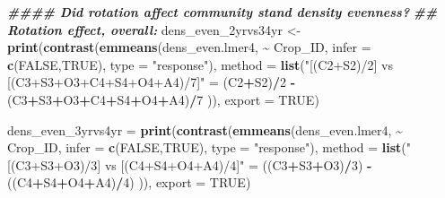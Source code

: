 \documentclass[
]{article}
\newenvironment{Shaded}{\begin{snugshade}}{\end{snugshade}}
\newcommand{\AttributeTok}[1]{\textcolor[rgb]{0.13,0.29,0.53}{#1}}
\newcommand{\ConstantTok}[1]{\textcolor[rgb]{0.56,0.35,0.01}{#1}}
\newcommand{\DecValTok}[1]{\textcolor[rgb]{0.00,0.00,0.81}{#1}}
\newcommand{\DocumentationTok}[1]{\textcolor[rgb]{0.56,0.35,0.01}{\textbf{\textit{#1}}}}
\newcommand{\FunctionTok}[1]{\textcolor[rgb]{0.13,0.29,0.53}{\textbf{#1}}}
\newcommand{\NormalTok}[1]{#1}
\newcommand{\OtherTok}[1]{\textcolor[rgb]{0.56,0.35,0.01}{#1}}
\newcommand{\SpecialCharTok}[1]{\textcolor[rgb]{0.81,0.36,0.00}{\textbf{#1}}}
\newcommand{\StringTok}[1]{\textcolor[rgb]{0.31,0.60,0.02}{#1}}
\begin{document}
\begin{Shaded}
\begin{Highlighting}[]
\DocumentationTok{\#\#\#\# Did rotation affect community stand density evenness? }
\DocumentationTok{\#\# Rotation effect, overall:}
\NormalTok{dens\_even\_2yrvs34yr }\OtherTok{\textless{}{-}} \FunctionTok{print}\NormalTok{(}\FunctionTok{contrast}\NormalTok{(}\FunctionTok{emmeans}\NormalTok{(dens\_even.lmer4, }\SpecialCharTok{\textasciitilde{}}\NormalTok{ Crop\_ID,}
                                              \AttributeTok{infer =} \FunctionTok{c}\NormalTok{(}\ConstantTok{FALSE}\NormalTok{,}\ConstantTok{TRUE}\NormalTok{), }
                                              \AttributeTok{type =} \StringTok{"response"}\NormalTok{),}
                                      \AttributeTok{method =} \FunctionTok{list}\NormalTok{(}\StringTok{"[(C2+S2)/2] vs [(C3+S3+O3+C4+S4+O4+A4)/7]"} \OtherTok{=}
\NormalTok{                                                      (C2}\SpecialCharTok{+}\NormalTok{S2)}\SpecialCharTok{/}\DecValTok{2} \SpecialCharTok{{-}}\NormalTok{ (C3}\SpecialCharTok{+}\NormalTok{S3}\SpecialCharTok{+}\NormalTok{O3}\SpecialCharTok{+}\NormalTok{C4}\SpecialCharTok{+}\NormalTok{S4}\SpecialCharTok{+}\NormalTok{O4}\SpecialCharTok{+}\NormalTok{A4)}\SpecialCharTok{/}\DecValTok{7}\NormalTok{ )),}
                             \AttributeTok{export =} \ConstantTok{TRUE}\NormalTok{)}


\NormalTok{dens\_even\_3yrvs4yr }\OtherTok{=} \FunctionTok{print}\NormalTok{(}\FunctionTok{contrast}\NormalTok{(}\FunctionTok{emmeans}\NormalTok{(dens\_even.lmer4, }\SpecialCharTok{\textasciitilde{}}\NormalTok{ Crop\_ID, }
                                            \AttributeTok{infer =} \FunctionTok{c}\NormalTok{(}\ConstantTok{FALSE}\NormalTok{,}\ConstantTok{TRUE}\NormalTok{),}
                                            \AttributeTok{type =} \StringTok{"response"}\NormalTok{), }
                                    \AttributeTok{method =} \FunctionTok{list}\NormalTok{(}\StringTok{"[(C3+S3+O3)/3] vs [(C4+S4+O4+A4)/4]"} \OtherTok{=}
\NormalTok{                                                    ((C3}\SpecialCharTok{+}\NormalTok{S3}\SpecialCharTok{+}\NormalTok{O3)}\SpecialCharTok{/}\DecValTok{3}\NormalTok{) }\SpecialCharTok{{-}}\NormalTok{ ((C4}\SpecialCharTok{+}\NormalTok{S4}\SpecialCharTok{+}\NormalTok{O4}\SpecialCharTok{+}\NormalTok{A4)}\SpecialCharTok{/}\DecValTok{4}\NormalTok{) )),}
                           \AttributeTok{export =} \ConstantTok{TRUE}\NormalTok{)}



\end{Highlighting}
\end{Shaded}
\end{document}
